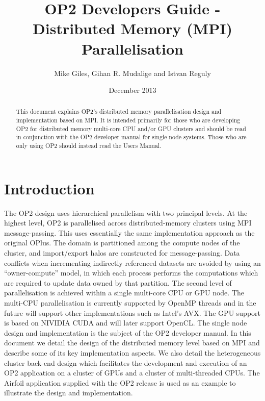 \documentclass[11pt]{article}
\date{December 2013}
\begin{document}
\title{OP2 Developers Guide - Distributed Memory (MPI) Parallelisation}
\author{Mike Giles, Gihan R. Mudalige and Istvan Reguly}

\maketitle


\begin{abstract}
\noindent This document explains OP2's distributed memory parallelisation design and implementation based on MPI.  It is
intended primarily for those who are developing OP2 for distributed memory multi-core CPU and/or GPU clusters and
should be read in conjunction with the OP2 developer manual for single node systems. Those who are only using OP2 should
instead read the Users Manual.
\end{abstract}

\newpage




\tableofcontents

\newpage

\section{Introduction}
The OP2 design uses hierarchical parallelism with two principal levels. At the highest level, OP2 is parallelised across
distributed-memory clusters using MPI message-passing.  This uses essentially the same implementation approach as the
original OPlus\cite{oplus}. The domain is partitioned among the compute nodes of the cluster, and import/export halos
are constructed for message-passing. Data conflicts when  incrementing indirectly referenced datasets are avoided by
using an ``owner-compute'' model, in which each process performs the computations which are required to update data
owned by that partition. The second level of parallelisation is achieved within a single multi-core CPU or
GPU node. The multi-CPU parallelisation is currently supported by OpenMP threads and in the future will support other
implementations such as Intel's AVX. The GPU support is based on NIVIDIA CUDA and will later support OpenCL. The single
node design and implementation is the subject of the OP2 developer manual. In this document we detail the design of the
distributed memory level based on MPI and describe some of its key implementation aspects. We also detail the
heterogeneous cluster back-end design which facilitates the development and execution of an OP2 application on a cluster
of GPUs and a cluster of multi-threaded CPUs. The Airfoil application supplied with the OP2 release is used as an
example to illustrate the design and implementation.
\end{document}

